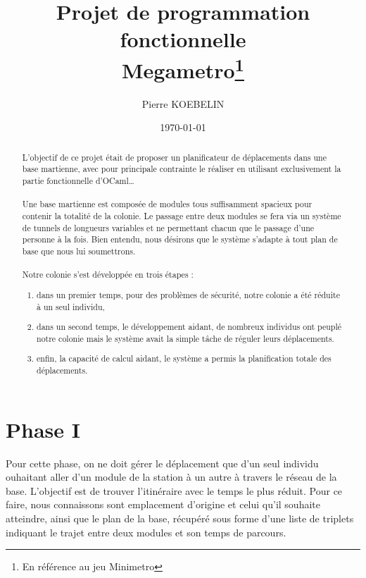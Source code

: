 \documentclass[11pt, a4paper, twoside, titlepage]{article}
\begin{document}
\title{{\titlefont Projet de programmation fonctionnelle}\\Megametro\thanks{En référence au jeu Minimetro}}
\author{Pierre KOEBELIN}
\date{\today} 
\maketitle


\begin{abstract}
L'objectif de ce projet était de proposer un planificateur de déplacements dans une base martienne, avec pour principale contrainte le réaliser en utilisant exclusivement la partie fonctionnelle d'OCaml\ldots\\
\\
Une base martienne est composée de modules tous suffisamment spacieux pour contenir la totalité de la colonie. Le passage entre deux modules se fera via un système de tunnels de longueurs variables et ne permettant chacun que le passage d'une personne à la fois. Bien entendu, nous désirons que le système s'adapte à tout plan de base que nous lui soumettrons.\\
\\
Notre colonie s'est développée en trois étapes :
\begin{enumerate}
\item dans un premier temps, pour des problèmes de sécurité, notre colonie a été réduite à un seul individu,
\item dans un second temps, le développement aidant, de nombreux individus ont peuplé notre colonie mais le système avait la simple tâche de réguler leurs déplacements.
\item enfin, la capacité de calcul aidant, le système a permis la planification totale des déplacements.
\end{enumerate}
\end{abstract}


\tableofcontents


\newpage
\section{Phase I}

Pour cette phase, on ne doit gérer le déplacement que d'un seul individu ouhaitant aller d'un module de la station à un autre à travers le réseau de la base. L'objectif est de trouver l'itinéraire avec le temps le plus réduit.
Pour ce faire, nous connaissons sont emplacement d'origine et celui qu'il souhaite atteindre, ainsi que le plan de la base, récupéré sous forme d'une liste de triplets indiquant le trajet entre deux modules et son temps de parcours.
\end{document}

